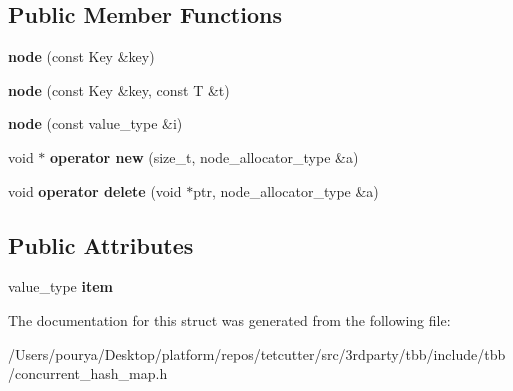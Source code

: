 \subsection*{Public Member Functions}
\begin{DoxyCompactItemize}
\item 
\hypertarget{structtbb_1_1interface5_1_1concurrent__hash__map_1_1node_a846c08f09f6f52dc39e48ffb37207883}{}{\bfseries node} (const Key \&key)\label{structtbb_1_1interface5_1_1concurrent__hash__map_1_1node_a846c08f09f6f52dc39e48ffb37207883}

\item 
\hypertarget{structtbb_1_1interface5_1_1concurrent__hash__map_1_1node_a717216adb451d4595c8cf7beefc203f4}{}{\bfseries node} (const Key \&key, const T \&t)\label{structtbb_1_1interface5_1_1concurrent__hash__map_1_1node_a717216adb451d4595c8cf7beefc203f4}

\item 
\hypertarget{structtbb_1_1interface5_1_1concurrent__hash__map_1_1node_a4e60b235cb1fcb29eaea9778edcdd5f9}{}{\bfseries node} (const value\+\_\+type \&i)\label{structtbb_1_1interface5_1_1concurrent__hash__map_1_1node_a4e60b235cb1fcb29eaea9778edcdd5f9}

\item 
\hypertarget{structtbb_1_1interface5_1_1concurrent__hash__map_1_1node_af165a53d8f03a455bc34b02baba24dbe}{}void $\ast$ {\bfseries operator new} (size\+\_\+t, node\+\_\+allocator\+\_\+type \&a)\label{structtbb_1_1interface5_1_1concurrent__hash__map_1_1node_af165a53d8f03a455bc34b02baba24dbe}

\item 
\hypertarget{structtbb_1_1interface5_1_1concurrent__hash__map_1_1node_a01fa78894e954fdb61b2b12e0c1a9420}{}void {\bfseries operator delete} (void $\ast$ptr, node\+\_\+allocator\+\_\+type \&a)\label{structtbb_1_1interface5_1_1concurrent__hash__map_1_1node_a01fa78894e954fdb61b2b12e0c1a9420}

\end{DoxyCompactItemize}
\subsection*{Public Attributes}
\begin{DoxyCompactItemize}
\item 
\hypertarget{structtbb_1_1interface5_1_1concurrent__hash__map_1_1node_a8d791911cc6c04ef5105fa43ab569f07}{}value\+\_\+type {\bfseries item}\label{structtbb_1_1interface5_1_1concurrent__hash__map_1_1node_a8d791911cc6c04ef5105fa43ab569f07}

\end{DoxyCompactItemize}


The documentation for this struct was generated from the following file\+:\begin{DoxyCompactItemize}
\item 
/\+Users/pourya/\+Desktop/platform/repos/tetcutter/src/3rdparty/tbb/include/tbb/concurrent\+\_\+hash\+\_\+map.\+h\end{DoxyCompactItemize}
